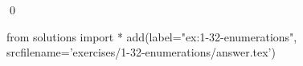 
\begin{ex}
  \label{ex:1-32-enumerations}
  
  \qed
\end{ex}
\begin{python0}
from solutions import *
add(label="ex:1-32-enumerations",
    srcfilename='exercises/1-32-enumerations/answer.tex')
\end{python0}
